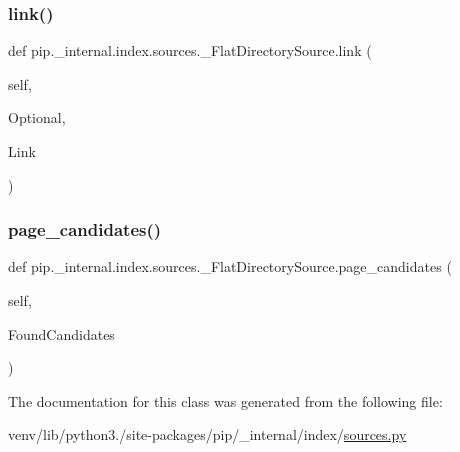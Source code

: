 \subsubsection{\texorpdfstring{link()}{link()}}
{\footnotesize\ttfamily def pip.\+\_\+internal.\+index.\+sources.\+\_\+\+Flat\+Directory\+Source.\+link (\begin{DoxyParamCaption}\item[{}]{self,  }\item[{}]{Optional,  }\item[{}]{Link }\end{DoxyParamCaption})}

\mbox{\label{classpip_1_1__internal_1_1index_1_1sources_1_1__FlatDirectorySource_ae8fb96dd75e8d5711d8452249438d400}} 
\subsubsection{\texorpdfstring{page\+\_\+candidates()}{page\_candidates()}}
{\footnotesize\ttfamily def pip.\+\_\+internal.\+index.\+sources.\+\_\+\+Flat\+Directory\+Source.\+page\+\_\+candidates (\begin{DoxyParamCaption}\item[{}]{self,  }\item[{}]{Found\+Candidates }\end{DoxyParamCaption})}



The documentation for this class was generated from the following file\+:\begin{DoxyCompactItemize}
\item 
venv/lib/python3./site-\/packages/pip/\+\_\+internal/index/\hyperlink{sources_8py}{sources.\+py}\end{DoxyCompactItemize}
